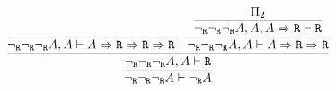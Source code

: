 \begin{enumerate}[(i)]
            $$
                \infer{
                    \neg_\R \neg_\R \neg_\R A \vdash \neg_\R A
                }{
                    \infer{
                        \neg_\R \neg_\R \neg_\R A, A \vdash \R
                    }{
                        \infer{
                            \neg_\R \neg_\R \neg_\R A, A \vdash A\Rightarrow\R\Rightarrow\R\Rightarrow\R
                        }{
                        }&
                        \infer{
                            \neg_\R \neg_\R \neg_\R A, A \vdash A\Rightarrow\R\Rightarrow\R
                        }{
                            \infer{
                                \neg_\R \neg_\R \neg_\R A, A, A\Rightarrow\R \vdash \R
                            }{
                                \Pi_2
                            }
                        }
                    }
                }
            $$
    \end{enumerate}